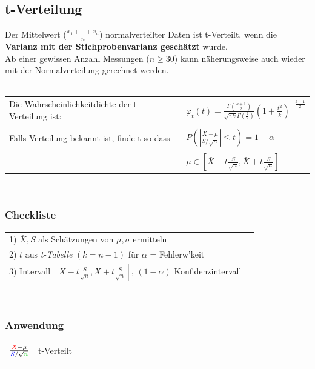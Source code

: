 	\subsection{t-Verteilung}
	Der Mittelwert ($\frac{x_1+\ldots+x_n}{n}$) normalverteilter Daten ist
    t-Verteilt, wenn die \textbf{Varianz mit der Stichprobenvarianz geschätzt} wurde.\\
    Ab einer gewissen Anzahl Messungen ($n \geq 30$) kann näherungsweise auch wieder mit
    der Normalverteilung gerechnet werden.  \\ \\
	\begin{tabular}{p{10cm}p{8cm}}
    Die Wahrscheinlichkeitdichte der
    t-Verteilung ist: &$\varphi_t(t)=\frac{\Gamma (\frac{k+1}{2})}{\sqrt{\pi
    k}\Gamma(\frac{k}{2})}\left(1+\frac{t^2}{k}\right)^{- \frac{k+1}{2}}$\\ \\
    Falls Verteilung bekannt ist, finde t so dass
    &$P\left(\left|\frac{\bar{X}-\mu}{S / \sqrt{n}}\right|\leq t\right) = 1 - \alpha$\\ \\
    &$\mu\in\left[\bar{X}-t\frac{S}{\sqrt{n}},\bar{X}+t\frac{S}{\sqrt{n}}\right]$\\
    \end{tabular}\\
	\begin{minipage}{10cm}
 		\subsubsection{Checkliste}
		\begin{tabular}{ll}
        1) $\bar{X}, S$ als Schätzungen von $\mu, \sigma$ ermitteln\\
        2) $t$ aus {\em t-Tabelle} $(k=n-1)$ für $\alpha$ = Fehlerw'keit\\
        3) Intervall
        $\left[\bar{X}-t\frac{S}{\sqrt{n}},\bar{X}+t\frac{S}{\sqrt{n}}\right]$,
        $(1-\alpha)$ Konfidenzintervall
        \end{tabular}\\
		\subsubsection{Anwendung}
		\begin{tabular}{ll}
        $\frac{\textcolor{red}{\bar{X}}-\mu}{\textcolor{blue}{S}/\sqrt{\textcolor{green}{n}}}$
        & t-Verteilt\\ \\
        \end{tabular}
    
    \end{minipage}
